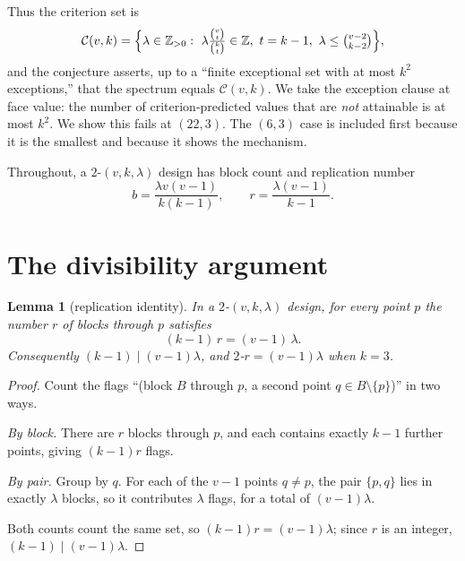 \documentclass[11pt]{article}
\newtheorem{lemma}[theorem]{Lemma}
\theoremstyle{definition}
\theoremstyle{remark}
\begin{document}
Thus the criterion set is
\begin{equation}\label{eq:criterion}
\mathcal C(v,k)=\Bigl\{\lambda\in\mathbb Z_{>0}:\
\lambda\tfrac{\binom{v}{t}}{\binom{k}{t}}\in\mathbb Z,\ t=k-1,\
\lambda\le \tbinom{v-2}{k-2}\Bigr\},
\end{equation}
and the conjecture asserts, up to a ``finite exceptional set with at most
$k^{2}$ exceptions,'' that the spectrum equals $\mathcal C(v,k)$. We take the
exception clause at face value: the number of criterion-predicted values that
are \emph{not} attainable is at most $k^{2}$. We show this fails at
$(22,3)$. The $(6,3)$ case is included first because it is the smallest and
because it shows the mechanism.

Throughout, a $2$-$(v,k,\lambda)$ design has block count and replication number
\begin{equation}\label{eq:bk}
b=\frac{\lambda v(v-1)}{k(k-1)},\qquad r=\frac{\lambda(v-1)}{k-1}.
\end{equation}

\section{The divisibility argument}

\begin{lemma}[replication identity]\label{lem:rep}
In a $2$-$(v,k,\lambda)$ design, for every point $p$ the number $r$ of blocks
through $p$ satisfies
\begin{equation}\label{eq:rep}
(k-1)\,r=(v-1)\,\lambda .
\end{equation}
Consequently $(k-1)\mid (v-1)\lambda$, and $2$-$r=(v-1)\lambda$ when $k=3$.
\end{lemma}

\begin{proof}
Count the flags ``(block $B$ through $p$, a second point $q\in B\setminus\{p\}$)''
in two ways.

\emph{By block.} There are $r$ blocks through $p$, and each contains exactly
$k-1$ further points, giving $(k-1)r$ flags.

\emph{By pair.} Group by $q$. For each of the $v-1$ points $q\neq p$, the pair
$\{p,q\}$ lies in exactly $\lambda$ blocks, so it contributes $\lambda$ flags,
for a total of $(v-1)\lambda$.

Both counts count the same set, so $(k-1)r=(v-1)\lambda$; since $r$ is an
integer, $(k-1)\mid(v-1)\lambda$.
\end{proof}
\end{document}
